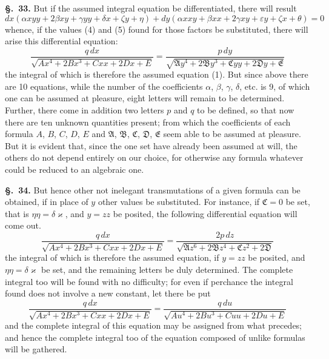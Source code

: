 \documentclass{article}
\begin{document}
\textbf{§.~33.} But if the assumed integral equation be differentiated, there will result
\[ dx(\alpha xyy + 2\beta xy + \gamma yy + \delta x + \zeta y + \eta)
   + dy(\alpha xxy + \beta xx + 2\gamma xy + \varepsilon y + \zeta x + \theta) = 0 \tag{6} \]
whence, if the values (4) and (5) found for those factors be substituted, there will arise this
differential equation:
\[ \frac{q\,dx}{\sqrt{Ax^{4} + 2Bx^{3} + Cxx + 2Dx + E}}
   = \frac{p\,dy}{\sqrt{\mathfrak{A}y^{4} + 2\mathfrak{B}y^{3} + \mathfrak{C}yy + 2\mathfrak{D}y + \mathfrak{E}}} \tag{7} \]
the integral of which is therefore the assumed equation (1). But since above there are 10 equations,
while the number of the coefficients $\alpha$, $\beta$, $\gamma$, $\delta$, etc. is 9, of which one
can be assumed at pleasure, eight letters will remain to be determined. Further, there come in
addition two letters $p$ and $q$ to be defined, so that now there are ten unknown quantities present;
from which the coefficients of each formula $A$, $B$, $C$, $D$, $E$ and $\mathfrak{A}$, $\mathfrak{B}$,
$\mathfrak{C}$, $\mathfrak{D}$, $\mathfrak{E}$ seem able to be assumed at pleasure. But it is evident
that, since the one set have already been assumed at will, the others do not depend entirely on our
choice, for otherwise any formula whatever could be reduced to an algebraic one.

\textbf{§.~34.} But hence other not inelegant transmutations of a given formula can be obtained, if
in place of $y$ other values be substituted. For instance, if $\mathfrak{C} = 0$ be set, that is
$\eta\eta = \delta\varkappa$, and $y = zz$ be posited, the following differential equation will come
out.
\[ \frac{q\,dx}{\sqrt{Ax^{4} + 2Bx^{3} + Cxx + 2Dx + E}}
   = \frac{2p\,dz}{\sqrt{\mathfrak{A}z^{6} + 2\mathfrak{B}z^{4} + \mathfrak{C}z^{2} + 2\mathfrak{D}}} \tag{8} \]
the integral of which is therefore the assumed equation, if $y = zz$ be posited, and
$\eta\eta = \delta\varkappa$ be set, and the remaining letters be duly
determined. The complete integral too will be found with no difficulty; for even if perchance the
integral found does not involve a new constant, let there be put
\[ \frac{q\,dx}{\sqrt{Ax^{4} + 2Bx^{3} + Cxx + 2Dx + E}} = \frac{q\,du}{\sqrt{Au^{4} + 2Bu^{3} + Cuu + 2Du + E}} \]
and the complete integral of this equation may be assigned from what precedes; and hence the
complete integral too of the equation composed of unlike formulas will be gathered.
\end{document}
